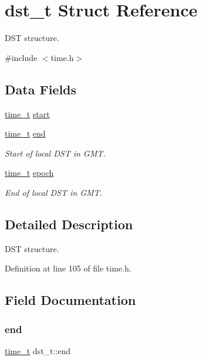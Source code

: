 \hypertarget{structdst__t}{}\section{dst\+\_\+t Struct Reference}
\label{structdst__t}


D\+ST structure.  




{\ttfamily \#include $<$time.\+h$>$}

\subsection*{Data Fields}
\begin{DoxyCompactItemize}
\item 
\hyperlink{time_8h_a3346b04b0420b32ccf6b706551b70762}{time\+\_\+t} \hyperlink{structdst__t_af1868fb321db3637664e3a3bf11cf56b}{start}
\item 
\hyperlink{time_8h_a3346b04b0420b32ccf6b706551b70762}{time\+\_\+t} \hyperlink{structdst__t_a9a6e1d16a7057ad1206b9230b073f99f}{end}
\begin{DoxyCompactList}\small\item\em Start of local D\+ST in G\+MT. \end{DoxyCompactList}\item 
\hyperlink{time_8h_a3346b04b0420b32ccf6b706551b70762}{time\+\_\+t} \hyperlink{structdst__t_ae8b931e1a2731b688e1af1253787827c}{epoch}
\begin{DoxyCompactList}\small\item\em End of local D\+ST in G\+MT. \end{DoxyCompactList}\end{DoxyCompactItemize}


\subsection{Detailed Description}
D\+ST structure. 

Definition at line 105 of file time.\+h.



\subsection{Field Documentation}
\mbox{\label{structdst__t_a9a6e1d16a7057ad1206b9230b073f99f}} 
\subsubsection{\texorpdfstring{end}{end}}
{\footnotesize\ttfamily \hyperlink{time_8h_a3346b04b0420b32ccf6b706551b70762}{time\+\_\+t} dst\+\_\+t\+::end}



